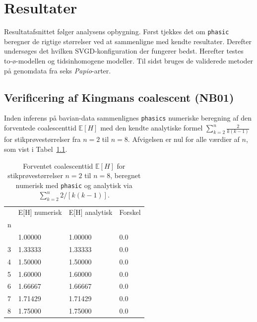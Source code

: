 \documentclass[
  10pt,
  a4paper,
]{scrbook}
\let\oldemph\emph
\renewcommand\emph[1]{\oldemph{\color{gray}#1}}
\begin{document}
\chapter{Resultater}\label{resultater}

Resultatafsnittet følger analysens opbygning. Først tjekkes det om
\texttt{phasic} beregner de rigtige størrelser ved at sammenligne med
kendte resultater. Derefter undersøges det hvilken SVGD-konfiguration
der fungerer bedst. Herefter testes to-ø-modellen og tidsinhomogene
modeller. Til sidst bruges de validerede metoder på genomdata fra seks
\emph{Papio}-arter.

\section{Verificering af Kingmans coalescent
(NB01)}\label{verificering-af-kingmans-coalescent-nb01}

Inden inferens på bavian-data sammenlignes \texttt{phasics} numeriske
beregning af den forventede coalescenttid \(\mathbb{E}[H]\) med den
kendte analytiske formel \(\sum_{k=2}^{n} \frac{2}{k(k-1)}\) for
stikprøvestørrelser fra \(n=2\) til \(n=8\). Afvigelsen er nul for alle
værdier af \(n\), som vist i Tabel~\ref{tbl-verificering}.

{

\begin{longtable}[]{@{}llll@{}}

\caption{\label{tbl-verificering}Forventet coalescenttid
\(\mathbb{E}[H]\) for stikprøvestørrelser \(n=2\) til \(n=8\), beregnet
numerisk med \texttt{phasic} og analytisk via
\(\sum_{k=2}^{n} 2/[k(k-1)]\).}

\tabularnewline

\toprule\noalign{}
& E{[}H{]} numerisk & E{[}H{]} analytisk & Forskel \\
n & & & \\
\midrule\noalign{}
\endhead
\bottomrule\noalign{}
\endlastfoot
2 & 1.00000 & 1.00000 & 0.0 \\
3 & 1.33333 & 1.33333 & 0.0 \\
4 & 1.50000 & 1.50000 & 0.0 \\
5 & 1.60000 & 1.60000 & 0.0 \\
6 & 1.66667 & 1.66667 & 0.0 \\
7 & 1.71429 & 1.71429 & 0.0 \\
8 & 1.75000 & 1.75000 & 0.0 \\

\end{longtable}

}
\end{document}
